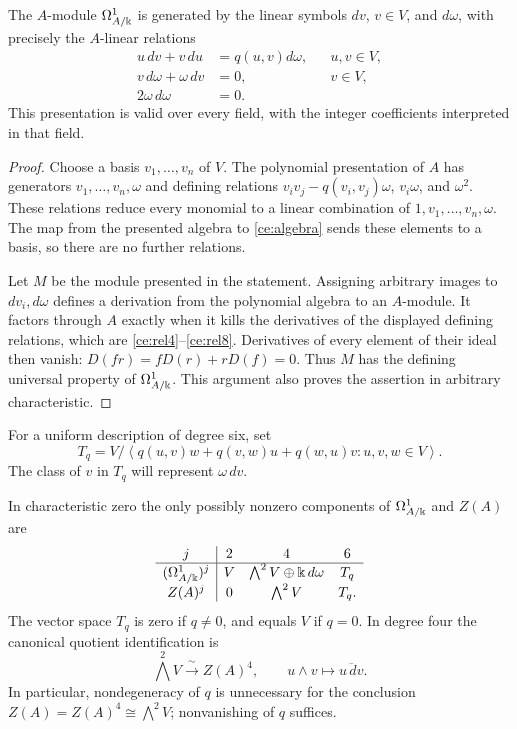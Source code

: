 \begin{proposition}
\label{ce:presentation}
The $A$-module $\Omega^1_{A/\Bbbk}$ is generated by the linear symbols $dv$,
$v\in V$, and $d\omega$, with precisely the $A$-linear relations
\begin{align}
 u\,dv+v\,du&=q(u,v)d\omega, &&u,v\in V,\label{ce:rel4}\\
 v\,d\omega+\omega\,dv&=0, &&v\in V,\label{ce:rel6}\\
 2\omega\,d\omega&=0.\label{ce:rel8}
\end{align}
This presentation is valid over every field, with the integer coefficients
interpreted in that field.
\end{proposition}

\begin{proof}
Choose a basis $v_1,\ldots,v_n$ of $V$.  The polynomial presentation of $A$
has generators $v_1,\ldots,v_n,\omega$ and defining relations
$v_iv_j-q(v_i,v_j)\omega$, $v_i\omega$, and $\omega^2$.
These relations reduce every monomial to a linear combination of
$1,v_1,\ldots,v_n,\omega$.  The map from the presented algebra to
\eqref{ce:algebra} sends these elements to a basis, so there are no further
relations.

Let $M$ be the module presented in the statement.  Assigning arbitrary
images to $dv_i,d\omega$ defines a derivation from the polynomial algebra
to an $A$-module.  It factors through $A$ exactly when it kills the
derivatives of the displayed defining relations, which are
\eqref{ce:rel4}--\eqref{ce:rel8}.  Derivatives of every element of their
ideal then vanish: $D(fr)=fD(r)+rD(f)=0$.  Thus $M$ has the defining
universal property of $\Omega^1_{A/\Bbbk}$.  This argument also proves the
assertion in arbitrary characteristic.
\end{proof}

For a uniform description of degree six, set
\begin{equation}\label{ce:Tq}
 T_q=V\big/\left\langle
 q(u,v)w+q(v,w)u+q(w,u)v:u,v,w\in V
 \right\rangle.
\end{equation}
The class of $v$ in $T_q$ will represent $\omega\,dv$.

\begin{theorem}
\label{ce:differentials}
In characteristic zero the only possibly nonzero components of
$\Omega^1_{A/\Bbbk}$ and $Z(A)$ are
\[
\begin{array}{c|ccc}
 j&2&4&6\\ \hline
 (\Omega^1_{A/\Bbbk})^j&V&\bigwedge^2V\oplus \Bbbk\,d\omega&T_q\\
 Z(A)^j&0&\bigwedge^2V&T_q.
\end{array}
\]
The vector space $T_q$ is zero if $q\ne0$, and equals $V$ if $q=0$.
In degree four the canonical quotient identification is
\begin{equation}\label{ce:wedge}
 \bigwedge^2V\xrightarrow{\ \sim\ }Z(A)^4,
 \qquad u\wedge v\longmapsto\overline{u\,dv}.
\end{equation}
In particular, nondegeneracy of $q$ is unnecessary for the conclusion
$Z(A)=Z(A)^4\cong\bigwedge^2V$; nonvanishing of $q$ suffices.
\end{theorem}

